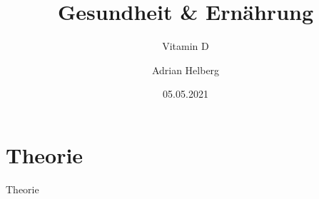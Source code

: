 \documentclass[xcolor=dvipsnames]{beamer}
\title{Gesundheit \& Ernährung}
\subtitle{Vitamin D}
\author{Adrian Helberg}
\date{05.05.2021}
\begin{document}
    \maketitle


    \section{Theorie}
    {
    \begin{frame}
        \begin{center}
            \Huge Theorie
        \end{center}
    \end{frame}
    }
\end{document}
